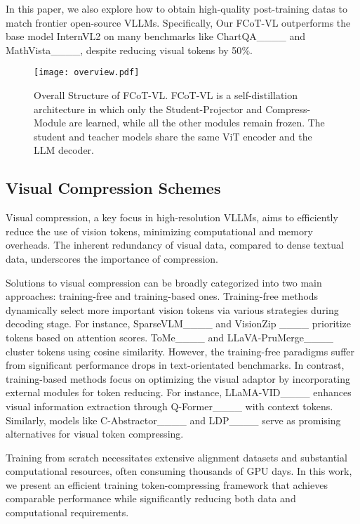 In this paper, we also explore how to obtain high-quality post-training datas to match frontier open-source VLLMs. Specifically, Our FCoT-VL outperforms the base model InternVL2
on many benchmarks like ChartQA____ and MathVista____, despite reducing visual tokens by 50$\%$.



\begin{figure*}[t]
  \centering
  \texttt{[image: overview.pdf]}
  \caption{Overall Structure of FCoT-VL. FCoT-VL is a self-distillation architecture in which only the Student-Projector and Compress-Module are learned, while all the other modules remain frozen. The student and teacher models share the same ViT encoder and the LLM decoder.}
  \label{fig:Overvieww}
\end{figure*}
\subsection{Visual Compression Schemes}
Visual compression, a key focus in high-resolution VLLMs, aims to efficiently reduce the use of vision tokens, minimizing computational and memory overheads. The inherent redundancy of visual data, compared to dense textual data, underscores the importance of compression.

Solutions to visual compression can be broadly categorized into two main approaches: training-free and training-based ones. Training-free methods dynamically select more important vision tokens via various strategies during decoding stage. For instance, SparseVLM____ and VisionZip ____ prioritize tokens based on attention scores. ToMe____ and LLaVA-PruMerge____ cluster tokens using cosine similarity. However, the training-free paradigms suffer from significant performance drops in text-orientated benchmarks. 
In contrast, training-based methods focus on optimizing the visual adaptor by incorporating external modules for token reducing. For instance, LLaMA-VID____ enhances visual information extraction through Q-Former____ with context tokens. Similarly, models like C-Abstractor____ and LDP____ serve as promising alternatives for visual token compressing.

Training from scratch necessitates extensive alignment datasets and substantial computational resources, often consuming thousands of GPU days. In this work, we present an efficient training token-compressing framework that achieves comparable performance while significantly reducing both data and computational requirements.




